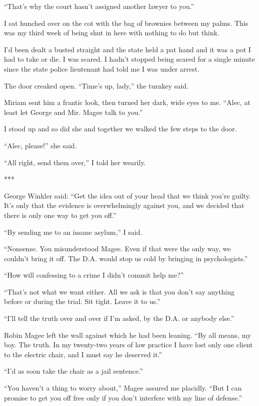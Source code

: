 {“That’s why the court hasn’t assigned another lawyer to you.”

I sat hunched over on the cot with the bag of brownies between my palms. This was my third week of being shut in here with nothing to do but think.

I’d been dealt a busted straight and the state held a pat hand and it was a pot I had to take or die. I was scared. I hadn’t stopped being scared for a single minute since the state police lieutenant had told me I was under arrest.

The door creaked open. “Time’s up, lady,” the turnkey said.

Miriam sent him a frantic look, then turned her dark, wide eyes to me. “Alec, at least let George and Mir. Magee talk to you.”

I stood up and so did she and together we walked the few steps to the door.

“Alec, please!” she said.

“All right, send them over,” I told her wearily.

***

George Winkler said: “Get the idea out of your head that we think you’re guilty. It’s only that the evidence is overwhelmingly against you, and we decided that there is only one way to get you off.”

“By sending me to an insane asylum,” I said.

“Nonsense. You misunderstood Magee. Even if that were the only way, we couldn’t bring it off. The D.A. would stop us cold by bringing in psychologists.”

“How will confessing to a crime I didn’t commit help me?”

“That’s not what we want either. All we ask is that you don’t say anything before or during the trial. Sit tight. Leave it to us.”

“I’ll tell the truth over and over if I’m asked, by the D.A. or anybody else.”

Robin Magee left the wall against which he had been leaning. “By all means, my boy. The truth. In my twenty-two years of law practice I have lost only one client to the electric chair, and I must say he deserved it.”

“I’d as soon take the chair as a jail sentence.”

“You haven’t a thing to worry about,” Magee assured me placidly. “But I can promise to get you off free only if you don’t interfere with my line of defense.”

}
